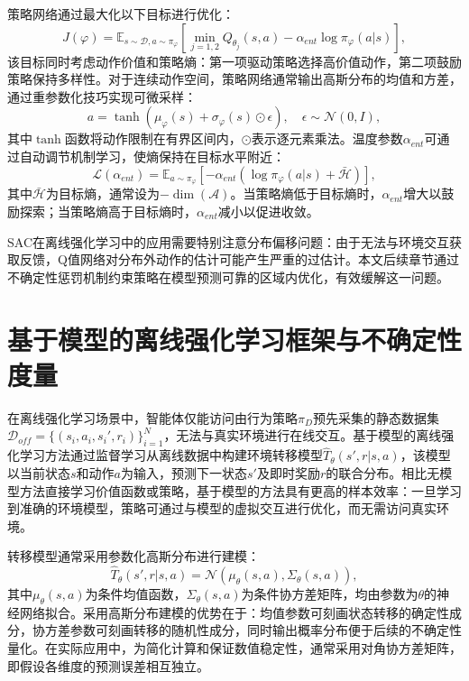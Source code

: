 策略网络通过最大化以下目标进行优化：
\begin{equation}\label{Eq:Chap2_sac_actor}
  J(\varphi) = \mathbb{E}_{s \sim \mathcal{D}, a \sim \pi_\varphi}\left[\min_{j=1,2} Q_{\theta_j}(s, a) - \alpha_{ent} \log \pi_\varphi(a|s)\right],
\end{equation}
该目标同时考虑动作价值和策略熵：第一项驱动策略选择高价值动作，第二项鼓励策略保持多样性。对于连续动作空间，策略网络通常输出高斯分布的均值和方差，通过重参数化技巧\cite{Kingma2014VAE}实现可微采样：
\begin{equation}\label{Eq:Chap2_reparameterization}
  a = \tanh(\mu_\varphi(s) + \sigma_\varphi(s) \odot \epsilon), \quad \epsilon \sim \mathcal{N}(0, I),
\end{equation}
其中$\tanh$函数将动作限制在有界区间内，$\odot$表示逐元素乘法。温度参数$\alpha_{ent}$可通过自动调节机制学习\cite{Haarnoja2018SAC}，使熵保持在目标水平附近：
\begin{equation}\label{Eq:Chap2_alpha_loss}
  \mathcal{L}(\alpha_{ent}) = \mathbb{E}_{a \sim \pi_\varphi}\left[-\alpha_{ent} \left(\log \pi_\varphi(a|s) + \bar{\mathcal{H}}\right)\right],
\end{equation}
其中$\bar{\mathcal{H}}$为目标熵，通常设为$-\dim(\mathcal{A})$。当策略熵低于目标熵时，$\alpha_{ent}$增大以鼓励探索；当策略熵高于目标熵时，$\alpha_{ent}$减小以促进收敛。

SAC在离线强化学习中的应用需要特别注意分布偏移问题：由于无法与环境交互获取反馈，Q值网络对分布外动作的估计可能产生严重的过估计。本文后续章节通过不确定性惩罚机制约束策略在模型预测可靠的区域内优化，有效缓解这一问题。


\section{基于模型的离线强化学习框架与不确定性度量}\label{Sec2.3}

在离线强化学习场景中，智能体仅能访问由行为策略$\pi_D$预先采集的静态数据集$\mathcal{D}_{off} = \{(s_i, a_i, s_i', r_i)\}_{i=1}^N$，无法与真实环境进行在线交互。基于模型的离线强化学习方法通过监督学习从离线数据中构建环境转移模型$\hat{T}_{\theta}(s', r|s, a)$，该模型以当前状态$s$和动作$a$为输入，预测下一状态$s'$及即时奖励$r$的联合分布。相比无模型方法直接学习价值函数或策略，基于模型的方法具有更高的样本效率：一旦学习到准确的环境模型，策略可通过与模型的虚拟交互进行优化，而无需访问真实环境。

转移模型通常采用参数化高斯分布进行建模：
\begin{equation}\label{Eq:Chap2_transition_model}
  \hat{T}_{\theta}(s', r|s, a) = \mathcal{N}(\mu_{\theta}(s, a), \Sigma_{\theta}(s, a)),
\end{equation}
其中$\mu_{\theta}(s, a)$为条件均值函数，$\Sigma_{\theta}(s, a)$为条件协方差矩阵，均由参数为$\theta$的神经网络拟合。采用高斯分布建模的优势在于：均值参数可刻画状态转移的确定性成分，协方差参数可刻画转移的随机性成分，同时输出概率分布便于后续的不确定性量化。在实际应用中，为简化计算和保证数值稳定性，通常采用对角协方差矩阵，即假设各维度的预测误差相互独立。

